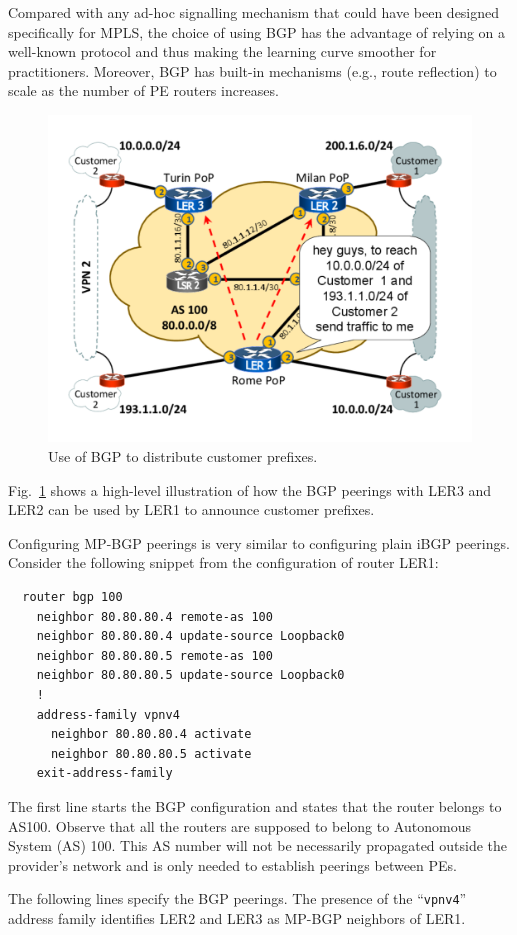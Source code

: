 \documentclass{article}
\newenvironment{codice}
{
\noindent
\begin{minipage}[b]{\columnwidth}
\definecolor{shadecolor}{rgb}{1,1,1}
\begin{framed}}
{
\vspace{-0.4cm}
\end{framed}
\end{minipage}
\definecolor{shadecolor}{rgb}{1,1,0.7}
}
\begin{document}
Compared with any ad-hoc signalling mechanism that could have been designed 
specifically for MPLS, the choice of using BGP has the advantage of relying on a 
well-known protocol and thus making the learning curve smoother for 
practitioners. Moreover, BGP has built-in mechanisms (e.g., route reflection) to 
scale as the number of PE routers increases.

\begin{figure}
\centering
 \includegraphics[trim=0cm 1.5cm 0cm 1.5cm, clip=true, width=0.7\columnwidth]{figures/mpls-slides-6}
 \caption{Use of BGP to distribute customer prefixes.}
 \label{fig:mpls-slides-6}
\end{figure}

\begin{shaded}
\noindent
Fig.~\ref{fig:mpls-slides-6} shows a high-level illustration 
of how the BGP peerings with LER3 and LER2 can be used by LER1 to announce 
customer prefixes.
\end{shaded}

\vspace{0.1cm}

\begin{shaded}
\noindent
Configuring MP-BGP peerings is very similar to configuring plain iBGP
peerings. 
Consider the following snippet from the configuration of router LER1:
\begin{codice}
\begin{verbatim}
  router bgp 100
    neighbor 80.80.80.4 remote-as 100
    neighbor 80.80.80.4 update-source Loopback0
    neighbor 80.80.80.5 remote-as 100
    neighbor 80.80.80.5 update-source Loopback0
    !
    address-family vpnv4
      neighbor 80.80.80.4 activate
      neighbor 80.80.80.5 activate
    exit-address-family
\end{verbatim}
\end{codice}

The first line starts the BGP configuration and states that the router belongs to AS100.
Observe that all the routers are supposed to belong to Autonomous System (AS) 100. This
AS number will not be necessarily propagated outside the provider's network and is only
needed to establish peerings between PEs.

The following lines specify the BGP peerings. The presence of the ``\texttt{vpnv4}''
address family identifies LER2 and LER3 as MP-BGP neighbors of LER1.
\end{shaded}
\end{document}
